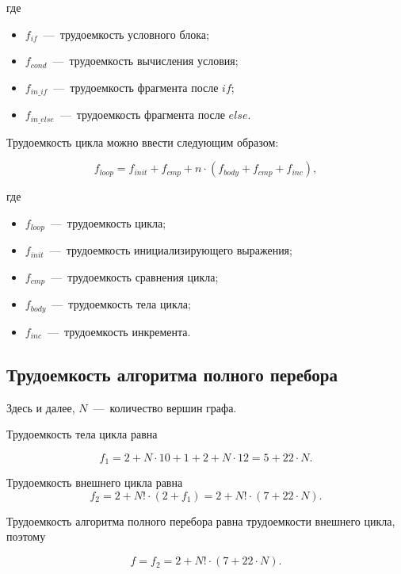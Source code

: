где

\begin{itemize}
	\item $f_{if}$~---~трудоемкость условного блока;
	\item $f_{cond}$~---~трудоемкость вычисления условия;
	\item $f_{in\_if}$~---~трудоемкость фрагмента после $if$;
	\item $f_{in\_else}$~---~трудоемкость фрагмента после $else$.
\end{itemize}

Трудоемкость цикла можно ввести следующим образом:


\begin{equation}
	f_{loop} = f_{init} + f_{cmp} + n \cdot (f_{body} + f_{cmp} + f_{inc}),
\end{equation}

где

\begin{itemize}
	\item $f_{loop}$~---~трудоемкость цикла;
	\item $f_{init}$~---~трудоемкость инициализирующего выражения;
	\item $f_{cmp}$~---~трудоемкость сравнения цикла;
	\item $f_{body}$~---~трудоемкость тела цикла;
	\item $f_{inc}$~---~трудоемкость инкремента.
\end{itemize}

\subsection{Трудоемкость алгоритма полного перебора}

Здесь и далее, $N$~---~количество вершин графа.

Трудоемкость тела цикла равна

\begin{equation}
	f_1 = 2 + N \cdot 10 + 1 + 2 + N \cdot 12 = 5 + 22 \cdot N.
\end{equation}

Трудоемкость внешнего цикла равна
\begin{equation}
	f_2 = 2 + N! \cdot (2 + f_1) = 2 + N! \cdot (7 + 22 \cdot N).
\end{equation}

Трудоемкость алгоритма полного перебора равна трудоемкости внешнего цикла, поэтому

\begin{equation}
	f = f_2 = 2 + N! \cdot (7 + 22 \cdot N).
\end{equation}


